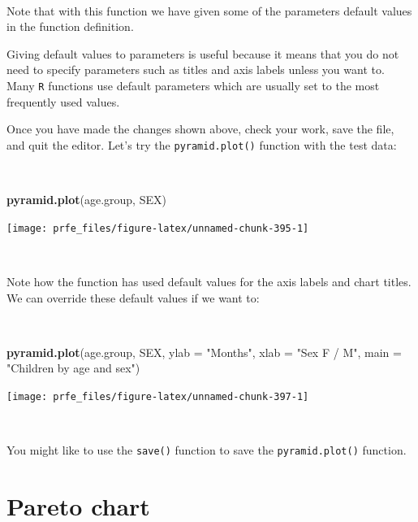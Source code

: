 \documentclass[12pt,a4paper]{book}
\newenvironment{Shaded}{\begin{snugshade}}{\end{snugshade}}
\newcommand{\DataTypeTok}[1]{\textcolor[rgb]{0.13,0.29,0.53}{#1}}
\newcommand{\KeywordTok}[1]{\textcolor[rgb]{0.13,0.29,0.53}{\textbf{#1}}}
\newcommand{\NormalTok}[1]{#1}
\newcommand{\StringTok}[1]{\textcolor[rgb]{0.31,0.60,0.02}{#1}}
\theoremstyle{definition}
\theoremstyle{definition}
\theoremstyle{definition}
\theoremstyle{remark}
\begin{document}
~

Note that with this function we have given some of the parameters
default values in the function definition.

Giving default values to parameters is useful because it means that you
do not need to specify parameters such as titles and axis labels unless
you want to. Many \texttt{R} functions use default parameters which are
usually set to the most frequently used values.

Once you have made the changes shown above, check your work, save the
file, and quit the editor. Let's try the \texttt{pyramid.plot()}
function with the test data:

~

\begin{Shaded}
\begin{Highlighting}[]
\KeywordTok{pyramid.plot}\NormalTok{(age.group, SEX)}
\end{Highlighting}
\end{Shaded}

\begin{center}\texttt{[image: prfe\_files/figure-latex/unnamed-chunk-395-1]} \end{center}

~

Note how the function has used default values for the axis labels and
chart titles. We can override these default values if we want to:

~

\begin{Shaded}
\begin{Highlighting}[]
\KeywordTok{pyramid.plot}\NormalTok{(age.group, SEX, }\DataTypeTok{ylab =} \StringTok{"Months"}\NormalTok{, }\DataTypeTok{xlab =} \StringTok{"Sex F / M"}\NormalTok{,}
             \DataTypeTok{main =} \StringTok{"Children by age and sex"}\NormalTok{)}
\end{Highlighting}
\end{Shaded}

\newpage

\begin{center}\texttt{[image: prfe\_files/figure-latex/unnamed-chunk-397-1]} \end{center}

~

You might like to use the \texttt{save()} function to save the
\texttt{pyramid.plot()} function.

\hypertarget{pareto-chart}{%
\section{Pareto chart}\label{pareto-chart}}
\end{document}
